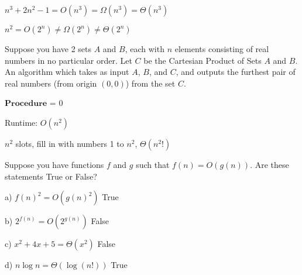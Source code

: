 \begin{ex}
$n^3 + 2n^2 - 1 = O(n^3) = \Omega(n^3) = \Theta(n^3)$
\end{ex}

\begin{ex}
$n^2 = O(2^n) \neq \Omega(2^n) \neq \Theta(2^n)$
\end{ex}

\begin{prob}
Suppose you have 2 sets $A$ and $B$, each with $n$ elements consisting of real numbers in no particular order. Let $C$ be the Cartesian Product of Sets $A$ and $B$. An algorithm which takes as input $A$, $B$, and $C$, and outputs the furthest pair of real numbers (from origin $(0, 0)$) from the set $C$.




\begin{algorithm}[Algorithm]
\SetAlgoLined
\DontPrintSemicolon
{}
$\mathbf{Procedure}$ \FurthestPair{\A$[1...\n]$, \B$[1...\n]$, \C$[1...\n^2][1...2]$}\;
\Max = 0\;
\Return \FurthestPair\;
\end{algorithm}


Runtime: $O(n^2)$
\end{prob}

\begin{prob}

$n^2$ slots, fill in with numbers 1 to $n^2$, $\Theta(n^2 !)$

\end{prob}

\begin{prob}

Suppose you have functions $f$ and $g$ such that $f(n) = O(g(n))$. Are these statements True or False?

a) $f(n)^2 = O(g(n)^2)$ True

b) $2^{f(n)} = O(2^{g(n)})$ False

c) $x^2 + 4x + 5 = \Theta(x^2)$ False

d) $n \log n = \Theta(\log(n!))$ True

\end{prob}

